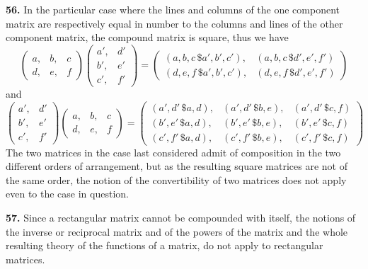 \documentclass[11pt,a4paper]{book}
\begin{document}
\begin{center}
\medskip
\noindent\textbf{56.} In the particular case where the lines and columns of the one component matrix are respectively equal in number to the columns and lines of the other component matrix, the compound matrix is square, thus we have
\[
\begin{pmatrix} a, & b, & c \\ d, & e, & f \end{pmatrix}
\begin{pmatrix} a', & d' \\ b', & e' \\ c', & f' \end{pmatrix}
=
\begin{pmatrix}
(a,b,c\,\$a',b',c'), & (a,b,c\,\$d',e',f') \\
(d,e,f\,\$a',b',c'), & (d,e,f\,\$d',e',f')
\end{pmatrix}
\]
and
\[
\begin{pmatrix} a', & d' \\ b', & e' \\ c', & f' \end{pmatrix}
\begin{pmatrix} a, & b, & c \\ d, & e, & f \end{pmatrix}
=
\begin{pmatrix}
(a',d'\,\$a,d), & (a',d'\,\$b,e), & (a',d'\,\$c,f) \\
(b',e'\,\$a,d), & (b',e'\,\$b,e), & (b',e'\,\$c,f) \\
(c',f'\,\$a,d), & (c',f'\,\$b,e), & (c',f'\,\$c,f)
\end{pmatrix}
\]
The two matrices in the case last considered admit of composition in the two different orders of arrangement, but as the resulting square matrices are not of the same order, the notion of the convertibility of two matrices does not apply even to the case in question.

\medskip
\noindent\textbf{57.} Since a rectangular matrix cannot be compounded with itself, the notions of the inverse or reciprocal matrix and of the powers of the matrix and the whole resulting theory of the functions of a matrix, do not apply to rectangular matrices.


\end{center}
\end{document}
